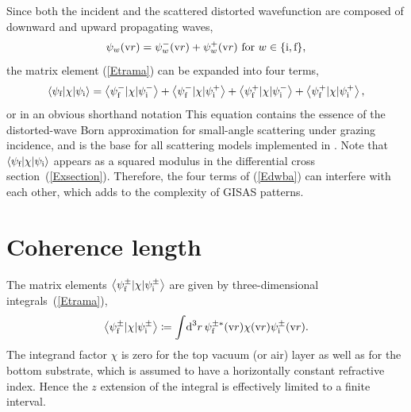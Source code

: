 Since both the incident
and the scattered distorted wavefunction
are composed of downward and upward propagating waves,
\begin{equation}\label{Epsipm}
  \psi_w(\text{v}{r})
  = \psi^-_w(\text{v}{r}) + \psi^+_w(\text{v}{r})\text{~for~}w\in\{\text{i},\text{f}\},
\end{equation}
%
the matrix element (\ref{Etrama})
can be expanded into four terms,
\begin{equation}\label{Edwba4}
  \left\langle \psi_{\text{f}}|\chi|\psi_{\text{i}}\right\rangle
  = \left\langle \psi^-_{\text{f}}|\chi|\psi^-_{\text{i}}\right\rangle
  + \left\langle \psi^-_{\text{f}}|\chi|\psi^+_{\text{i}}\right\rangle
  + \left\langle \psi^+_{\text{f}}|\chi|\psi^-_{\text{i}}\right\rangle
  + \left\langle \psi^+_{\text{f}}|\chi|\psi^+_{\text{i}}\right\rangle,
\end{equation}
%
%
or in an obvious shorthand notation
This equation contains the essence of
the distorted-wave Born approximation
for small-angle scattering under grazing incidence,
and is the base for all scattering models implemented in \BornAgain.
Note that $\left\langle \psi_{\text{f}}|\chi|\psi_{\text{i}}\right\rangle$
appears as a squared modulus
in the differential cross section~(\ref{Exsection}).
Therefore, the four terms of (\ref{Edwba}) can interfere with each other,
which adds to the complexity of GISAS patterns.

%


\section{Coherence length}\label{Scoherlen}

%
The matrix elements $\left\langle \psi^\pm_{\text{f}}|\chi|\psi^\pm_{\text{i}}\right\rangle$
are given by three-dimensional integrals~(\ref{Etrama}),
\begin{equation}\label{Etrama3}
  \left\langle \psi_{\text{f}}^\pm|\chi|\psi_{\text{i}}^\pm\right\rangle
  \coloneqq  \int\!\text{d}^3r\, \psi^{\pm*}_{\text{f}}(\text{v}{r})\chi(\text{v}{r})\psi^\pm_{\text{i}}(\text{v}{r}).
\end{equation}
The integrand factor $\chi$ is zero for
the top vacuum (or air) layer as well as for the bottom substrate,
which is assumed to have a horizontally constant refractive index.
Hence the $z$ extension of the integral is effectively limited
to a finite interval.

